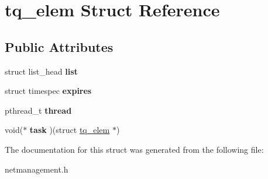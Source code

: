 \hypertarget{structtq__elem}{\section{tq\-\_\-elem \-Struct \-Reference}
\label{structtq__elem}
}
\subsection*{\-Public \-Attributes}
\begin{DoxyCompactItemize}
\item 
\hypertarget{structtq__elem_a270551eb0854f209aa19f1bf7ce6e7b7}{struct list\-\_\-head {\bfseries list}}\label{structtq__elem_a270551eb0854f209aa19f1bf7ce6e7b7}

\item 
\hypertarget{structtq__elem_a6c1da83a9825024430cce554b29ad5f7}{struct timespec {\bfseries expires}}\label{structtq__elem_a6c1da83a9825024430cce554b29ad5f7}

\item 
\hypertarget{structtq__elem_a2f241f88ab7240d69beefa27964a2f81}{pthread\-\_\-t {\bfseries thread}}\label{structtq__elem_a2f241f88ab7240d69beefa27964a2f81}

\item 
\hypertarget{structtq__elem_ac08599eafb88d5b572ddb822b3e91edb}{void($\ast$ {\bfseries task} )(struct \hyperlink{structtq__elem}{tq\-\_\-elem} $\ast$)}\label{structtq__elem_ac08599eafb88d5b572ddb822b3e91edb}

\end{DoxyCompactItemize}


\-The documentation for this struct was generated from the following file\-:\begin{DoxyCompactItemize}
\item 
netmanagement.\-h\end{DoxyCompactItemize}
